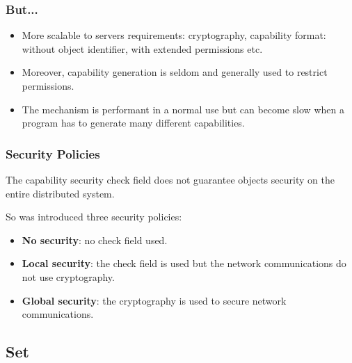 
\begin{frame}
  \frametitle{But...}

  \begin{itemize}[<+->]
    \item
      More scalable to servers requirements: cryptography,
      capability format: without object identifier, with extended
      permissions etc.
    \item
      Moreover, capability generation is seldom and generally used
      to restrict permissions.
    \item
      The mechanism is performant in a normal use but can become
      slow when a program has to generate many different capabilities.
  \end{itemize}
\end{frame}


\begin{frame}
  \frametitle{Security Policies}

  The capability security check field does not guarantee objects security on
  the entire distributed system.

  \-

  So was introduced three security policies:

  \begin{itemize}[<+->]
    \item
      \textbf{No security}: no check field used.
    \item
      \textbf{Local security}: the check field is used but the
      network communications do not use cryptography.
    \item
      \textbf{Global security}: the cryptography is used to secure
      network communications.
  \end{itemize}
\end{frame}

%
%

\subsection{Set}


